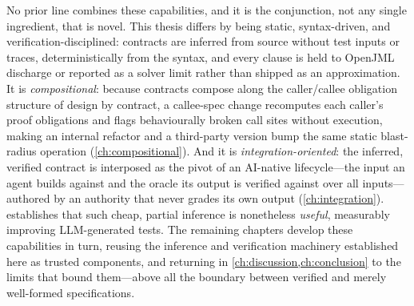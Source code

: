 No prior line combines these capabilities, and it is the conjunction, not any
single ingredient, that is novel. This thesis differs by being static,
syntax-driven, and verification-disciplined: contracts are inferred from source
without test inputs or traces, deterministically from the syntax, and every clause
is held to OpenJML discharge or reported as a solver limit rather than shipped as an
approximation. It is \emph{compositional}: because contracts compose along the
caller/callee obligation structure of design by contract, a callee-spec change
recomputes each caller's proof obligations and flags behaviourally broken call
sites without execution, making an internal refactor and a third-party version bump
the same static blast-radius operation (\cref{ch:compositional}). And it is
\emph{integration-oriented}: the inferred, verified contract is interposed as the
pivot of an AI-native lifecycle---the input an agent builds against and the oracle
its output is verified against over all inputs---authored by an authority that never
grades its own output (\cref{ch:integration}).  establishes that
such cheap, partial inference is nonetheless \emph{useful}, measurably improving
LLM-generated tests. The remaining chapters develop these capabilities in turn,
reusing the inference and verification machinery established here as trusted
components, and returning in \cref{ch:discussion,ch:conclusion} to the limits that
bound them---above all the boundary between verified and merely well-formed
specifications.
